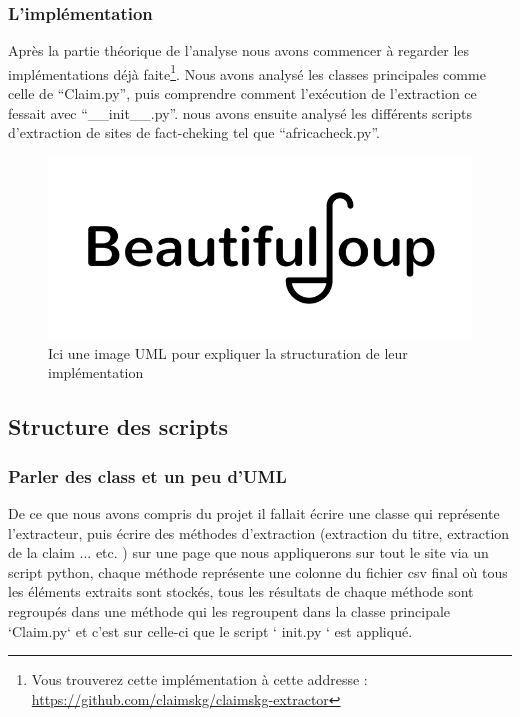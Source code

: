 \documentclass[oneside,13pt,a4paper]{report}
\begin{document}
\subsubsection*{L'implémentation}

Après la partie théorique de l'analyse nous avons commencer à regarder les implémentations déjà faite\footnote{Vous trouverez cette implémentation à cette addresse : \url{https://github.com/claimskg/claimskg-extractor}}. Nous avons analysé les classes principales comme celle de \enquote{Claim.py}, puis comprendre comment l'exécution de l'extraction ce fessait avec \enquote{\_\_init\_\_.py}. nous avons ensuite analysé les différents scripts d'extraction de sites de fact-cheking tel que \enquote{africacheck.py}.

\begin{figure}[h]
	\centering
	\begin{minipage}[c]{.5\linewidth}
		\includegraphics[width=1\textwidth]{img/bs.png}
		\caption{Ici une image UML pour expliquer la structuration de leur implémentation}
	\end{minipage}
\end{figure}


\subsection{Structure des scripts}
\subsubsection*{Parler des class et un peu d'UML}

De ce que nous avons compris du projet il fallait écrire une classe qui représente l'extracteur, puis écrire des méthodes d'extraction (extraction du titre, extraction de la claim ... etc. ) sur une page que nous appliquerons sur tout le site via un script python, chaque méthode représente une colonne du fichier csv final où tous les éléments extraits sont stockés, tous les résultats de chaque méthode sont regroupés dans une méthode qui les regroupent dans la classe principale `Claim.py` et c'est sur celle-ci que le script ` init.py ` est appliqué.
\end{document}

